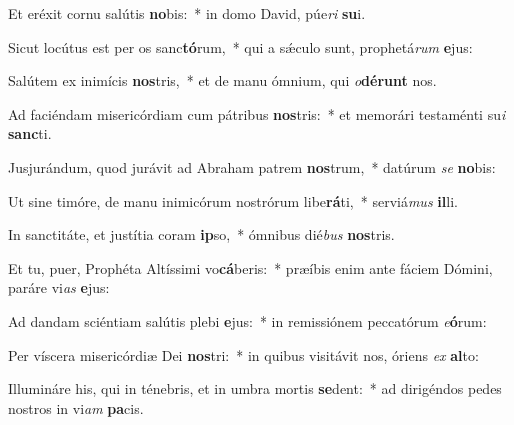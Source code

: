 \item Et eréxit cornu salútis \textbf{no}bis:~* in domo David, púe\textit{ri} \textbf{su}i.
\item Sicut locútus est per os sanc\textbf{tó}rum,~* qui a sǽculo sunt, prophetá\textit{rum} \textbf{e}jus:
\item Salútem ex inimícis \textbf{nos}tris,~* et de manu ómnium, qui \textit{o}\textbf{dé}\textbf{runt} nos.
\item Ad faciéndam misericórdiam cum pátribus \textbf{nos}tris:~* et memorári testaménti su\textit{i} \textbf{sanc}ti.
\item Jusjurándum, quod jurávit ad Abraham patrem \textbf{nos}trum,~* datúrum \textit{se} \textbf{no}bis:
\item Ut sine timóre, de manu inimicórum nostrórum libe\textbf{rá}ti,~* serviá\textit{mus} \textbf{il}li.
\item In sanctitáte, et justítia coram \textbf{ip}so,~* ómnibus dié\textit{bus} \textbf{nos}tris.
\item Et tu, puer, Prophéta Altíssimi vo\textbf{cá}beris:~* præíbis enim ante fáciem Dómini, paráre vi\textit{as} \textbf{e}jus:
\item Ad dandam sciéntiam salútis plebi \textbf{e}jus:~* in remissiónem peccatórum \textit{e}\textbf{ó}rum:
\item Per víscera misericórdiæ Dei \textbf{nos}tri:~* in quibus visitávit nos, óriens \textit{ex} \textbf{al}to:
\item Illumináre his, qui in ténebris, et in umbra mortis \textbf{se}dent:~* ad dirigéndos pedes nostros in vi\textit{am} \textbf{pa}cis.
